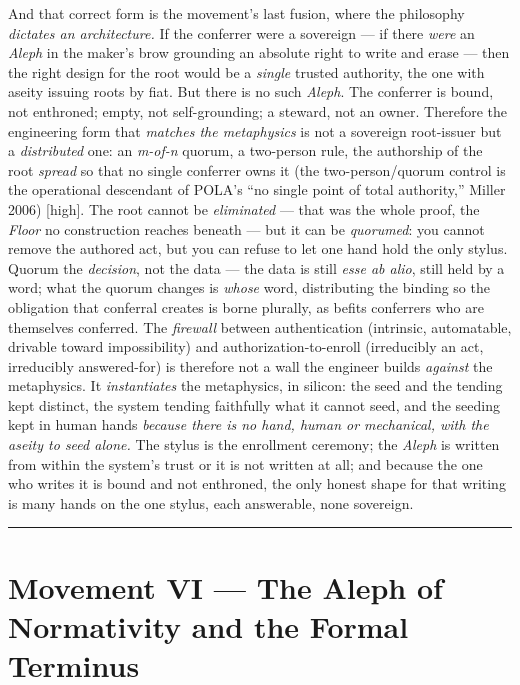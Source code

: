 \documentclass[11pt]{article}
\begin{document}
And that correct form is the movement's last fusion, where the philosophy \emph{dictates an architecture.} If the conferrer were a sovereign — if there \emph{were} an \emph{Aleph} in the maker's brow grounding an absolute right to write and erase — then the right design for the root would be a \emph{single} trusted authority, the one with aseity issuing roots by fiat. But there is no such \emph{Aleph}. The conferrer is bound, not enthroned; empty, not self-grounding; a steward, not an owner. Therefore the engineering form that \emph{matches the metaphysics} is not a sovereign root-issuer but a \emph{distributed} one: an \emph{m-of-n} quorum, a two-person rule, the authorship of the root \emph{spread} so that no single conferrer owns it (the two-person/\allowbreak{}quorum control is the operational descendant of POLA's ``no single point of total authority,'' Miller 2006) [high]. The root cannot be \emph{eliminated} — that was the whole proof, the \emph{Floor} no construction reaches beneath — but it can be \emph{quorumed}: you cannot remove the authored act, but you can refuse to let one hand hold the only stylus. Quorum the \emph{decision}, not the data — the data is still \emph{esse ab alio}, still held by a word; what the quorum changes is \emph{whose} word, distributing the binding so the obligation that conferral creates is borne plurally, as befits conferrers who are themselves conferred. The \emph{firewall} between authentication (intrinsic, automatable, drivable toward impossibility) and authorization-to-enroll (irreducibly an act, irreducibly answered-for) is therefore not a wall the engineer builds \emph{against} the metaphysics. It \emph{instantiates} the metaphysics, in silicon: the seed and the tending kept distinct, the system tending faithfully what it cannot seed, and the seeding kept in human hands \emph{because there is no hand, human or mechanical, with the aseity to seed alone.} The stylus is the enrollment ceremony; the \emph{Aleph} is written from within the system's trust or it is not written at all; and because the one who writes it is bound and not enthroned, the only honest shape for that writing is many hands on the one stylus, each answerable, none sovereign.

\medskip\noindent\rule{\linewidth}{0.3pt}\medskip

\section*{Movement VI — The Aleph of Normativity and the Formal Terminus}
\end{document}
